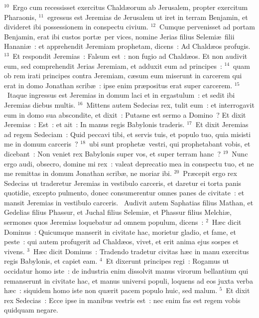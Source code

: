 ${}^{10}$~Ergo cum recessisset exercitus Chald\ae orum ab Jerusalem, propter exercitum Pharaonis,
${}^{11}$~egressus est Jeremias de Jerusalem ut iret in terram Benjamin, et divideret ibi possessionem in conspectu civium.
${}^{12}$~Cumque pervenisset ad portam Benjamin, erat ibi custos port\ae\ per vices, nomine Jerias filius Selemi\ae\ filii Hanani\ae~: et apprehendit Jeremiam prophetam, dicens~: Ad Chald\ae os profugis.
${}^{13}$~Et respondit Jeremias~: Falsum est~: non fugio ad Chald\ae os. Et non audivit eum, sed comprehendit Jerias Jeremiam, et adduxit eum ad principes~:
${}^{14}$~quam ob rem irati principes contra Jeremiam, c\ae sum eum miserunt in carcerem qui erat in domo Jonathan scrib\ae~: ipse enim pr\ae positus erat super carcerem.
${}^{15}$~Itaque ingressus est Jeremias in domum laci et in ergastulum~: et sedit ibi Jeremias diebus multis.
${}^{16}$~Mittens autem Sedecias rex, tulit eum~: et interrogavit eum in domo sua abscondite, et dixit~: Putasne est sermo a Domino~? Et dixit Jeremias~: Est~: et ait~: In manus regis Babylonis traderis.
${}^{17}$~Et dixit Jeremias ad regem Sedeciam~: Quid peccavi tibi, et servis tuis, et populo tuo, quia misisti me in domum carceris~?
${}^{18}$~ubi sunt prophet\ae\ vestri, qui prophetabant vobis, et dicebant~: Non veniet rex Babylonis super vos, et super terram hanc~?
${}^{19}$~Nunc ergo audi, obsecro, domine mi rex~: valeat deprecatio mea in conspectu tuo, et ne me remittas in domum Jonathan scrib\ae , ne moriar ibi.
${}^{20}$~Pr\ae cepit ergo rex Sedecias ut traderetur Jeremias in vestibulo carceris, et daretur ei torta panis quotidie, excepto pulmento, donec consumerentur omnes panes de civitate~: et mansit Jeremias in vestibulo carceris.
~\lettrine[lines=10,image=true,loversize=0.05,lraise=-0.03]{A}{}udivit autem Saphatias filius Mathan, et Gedelias filius Phassur, et Juchal filius Selemi\ae , et Phassur filius Melchi\ae , sermones quos Jeremias loquebatur ad omnem populum, dicens~:
${}^{2}$~H\ae c dicit Dominus~: Quicumque manserit in civitate hac, morietur gladio, et fame, et peste~: qui autem profugerit ad Chald\ae os, vivet, et erit anima ejus sospes et vivens.
${}^{3}$~H\ae c dicit Dominus~: Tradendo tradetur civitas h\ae c in manu exercitus regis Babylonis, et capiet eam.
${}^{4}$~Et dixerunt principes regi~: Rogamus ut occidatur homo iste~: de industria enim dissolvit manus virorum bellantium qui remanserunt in civitate hac, et manus universi populi, loquens ad eos juxta verba h\ae c~: siquidem homo iste non qu\ae rit pacem populo huic, sed malum.
${}^{5}$~Et dixit rex Sedecias~: Ecce ipse in manibus vestris est~: nec enim fas est regem vobis quidquam negare.
